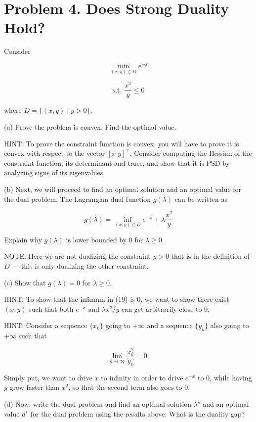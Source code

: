 \documentclass[
	12pt,
]{fphw}
\begin{document}
\newpage
\section*{Problem 4. Does Strong Duality Hold?}

Consider

\[
\min_{(x,y)\in D} e^{-x}
\tag{17}
\]

\[
\text{s.t. } \frac{x^2}{y} \le 0
\tag{18}
\]

where \(D = \{(x,y) \mid y > 0\}\).

(a) Prove the problem is convex.
Find the optimal value.

HINT: To prove the constraint function is convex, you will have to prove it is convex with respect to the vector \([x\;y]^\top\).
Consider computing the Hessian of the constraint function, its determinant and trace, and show that it is PSD by analyzing signs of its eigenvalues.

(b) Next, we will proceed to find an optimal solution and an optimal value for the dual problem.
The Lagrangian dual function \(g(\lambda)\) can be written as

\[
g(\lambda) = \inf_{(x,y)\in D} e^{-x} + \lambda \frac{x^2}{y}
\tag{19}
\]

Explain why \(g(\lambda)\) is lower bounded by 0 for \(\lambda \ge 0\).

NOTE: Here we are not dualizing the constraint \(y > 0\) that is in the definition of \(D\) — this is only dualizing the other constraint.

(c) Show that \(g(\lambda) = 0\) for \(\lambda \ge 0\).

HINT: To show that the infimum in (19) is 0, we want to show there exist \((x,y)\) such that both \(e^{-x}\) and \(\lambda x^2/y\) can get arbitrarily close to 0.

HINT: Consider a sequence \(\{x_k\}\) going to \(+\infty\) and a sequence \(\{y_k\}\) also going to \(+\infty\) such that

\[
\lim_{k\to\infty} \frac{x_k^2}{y_k} = 0.
\]

Simply put, we want to drive \(x\) to infinity in order to drive \(e^{-x}\) to 0,
while having \(y\) grow faster than \(x^2\), so that the second term also goes to 0.

(d) Now, write the dual problem and find an optimal solution \(\lambda^\star\) and an optimal value \(d^\star\) for the dual problem using the results above.
What is the duality gap?
\end{document}
